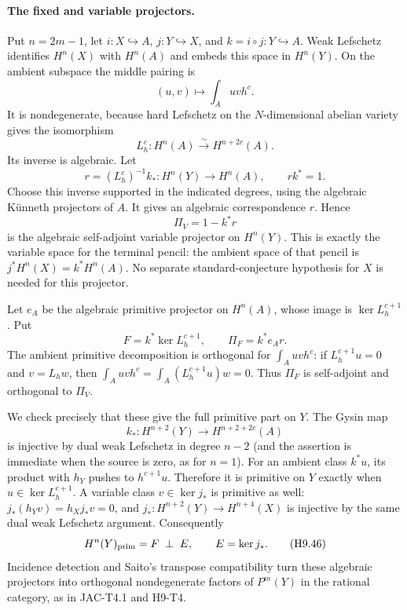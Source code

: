\documentclass[11pt,a4paper]{article}
\begin{document}
\paragraph{The fixed and variable projectors.}
Put $n=2m-1$, let $i:X\hookrightarrow A$, $j:Y\hookrightarrow X$,
and $k=i\circ j:Y\hookrightarrow A$. Weak Lefschetz identifies
$H^n(X)$ with $H^n(A)$ and embeds this space in $H^n(Y)$.
On the ambient subspace the middle pairing is
\[
 (u,v)\longmapsto\int_Auvh^c.
\]
It is nondegenerate, because hard Lefschetz on the $N$-dimensional
abelian variety gives the isomorphism
\[
 L_h^c:H^n(A)\xrightarrow{\ \sim\ }H^{n+2c}(A).
\]
Its inverse is algebraic. Let
\[
 r=(L_h^c)^{-1}k_*:H^n(Y)\longrightarrow H^n(A),
 \qquad r k^*=1.
\]
Choose this inverse supported in the indicated degrees, using the
algebraic K\"unneth projectors of $A$. It gives an algebraic
correspondence $r$. Hence
\[
 \Pi_V=1-k^*r
\]
is the algebraic self-adjoint variable projector on $H^n(Y)$.
This is exactly the variable space for the terminal pencil: the
ambient space of that pencil is $j^*H^n(X)=k^*H^n(A)$.
No separate standard-conjecture hypothesis for $X$ is needed for this
projector.

Let $e_A$ be the algebraic primitive projector on $H^n(A)$, whose
image is $\ker L_h^{c+1}$. Put
\[
 F=k^*\ker L_h^{c+1},\qquad \Pi_F=k^*e_A r.
\]
The ambient primitive decomposition is orthogonal for
$\int_Auvh^c$: if $L_h^{c+1}u=0$ and $v=L_hw$, then
$\int_Auvh^c=\int_A(L_h^{c+1}u)w=0$.
Thus $\Pi_F$ is self-adjoint and orthogonal to $\Pi_V$.

We check precisely that these give the full primitive part on $Y$.
The Gysin map
\[
 k_*:H^{n+2}(Y)\longrightarrow H^{n+2+2c}(A)
\]
is injective by dual weak Lefschetz in degree $n-2$ (and the assertion
is immediate when the source is zero, as for $n=1$).
For an ambient class $k^*u$, its product with $h_Y$ pushes to
$h^{c+1}u$. Therefore it is primitive on $Y$ exactly when
$u\in\ker L_h^{c+1}$. A variable class $v\in\ker j_*$ is primitive
as well: $j_*(h_Yv)=h_Xj_*v=0$, and
$j_*:H^{n+2}(Y)\to H^{n+4}(X)$ is injective by the same dual weak
Lefschetz argument. Consequently
\[
 H^n(Y)_{\rm prim}=F\ \mathbin{\perp}\ E,
 \qquad E=\ker j_*.
                                                               \tag{H9.46}
\]
Incidence detection and Saito's transpose compatibility turn these
algebraic projectors into orthogonal nondegenerate factors of
$P^m(Y)$ in the rational category, as in JAC-T4.1 and H9-T4.
\end{document}
